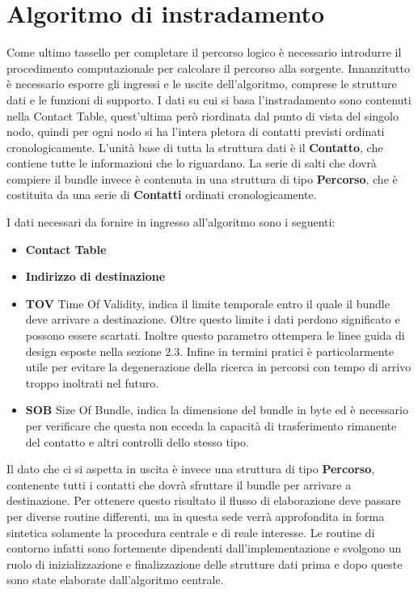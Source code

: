 \documentclass[12pt,a4paper,oneside]{book}
\begin{document}
		

		\section{Algoritmo di instradamento}
		
		Come ultimo tassello per completare il percorso logico è necessario introdurre il procedimento computazionale per calcolare il percorso alla sorgente. Innanzitutto è necessario esporre gli ingressi e le uscite dell'algoritmo, comprese le strutture dati e le funzioni di supporto. I dati su cui si basa l'instradamento sono contenuti nella Contact Table, quest'ultima però riordinata dal punto di vista del singolo nodo, quindi per ogni nodo si ha l'intera pletora di contatti previsti ordinati cronologicamente. L'unità base di tutta la struttura dati è il {\bf Contatto}, che contiene tutte le informazioni che lo riguardano. La serie di salti che dovrà compiere il bundle invece è contenuta in una struttura di tipo {\bf Percorso}, che è costituita da una serie di {\bf Contatti} ordinati cronologicamente. 
		
		I dati necessari da fornire in ingresso all'algoritmo sono i seguenti:
		\begin{itemize}
			\item {\bf Contact Table}
			\item {\bf Indirizzo di destinazione}
			\item {\bf TOV} Time Of Validity, indica il limite temporale entro il quale il bundle deve arrivare a destinazione. Oltre questo limite i dati perdono significato e possono essere scartati. Inoltre questo parametro ottempera le linee guida di design esposte nella sezione 2.3. Infine in termini pratici è particolarmente utile per evitare la degenerazione della ricerca in percorsi con tempo di arrivo troppo inoltrati nel futuro. 
			\item {\bf SOB}	Size Of Bundle, indica la dimensione del bundle in byte ed è necessario per verificare che questa non ecceda la capacità di trasferimento rimanente del contatto e altri controlli dello stesso tipo. 
		\end{itemize}
		
		Il dato che ci si aspetta in uscita è invece una struttura di tipo {\bf Percorso}, contenente tutti i contatti che dovrà sfruttare il bundle per arrivare a destinazione. Per ottenere questo risultato il flusso di elaborazione deve passare per diverse routine differenti, ma in questa sede verrà approfondita in forma sintetica solamente la procedura centrale e di reale interesse. Le routine di contorno infatti sono fortemente dipendenti dall'implementazione e svolgono un ruolo di inizializzazione e finalizzazione delle strutture dati prima e dopo queste sono state elaborate dall'algoritmo centrale.
		
\end{document}
